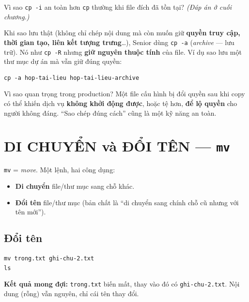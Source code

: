 \documentclass[12pt,a4paper]{article}
\newcommand{\cmd}[1]{\texttt{#1}}
\begin{document}
\begin{checkbox}[title={Tự kiểm tra 3}]
Vì sao \cmd{cp -i} an toàn hơn \cmd{cp} thường khi file đích đã tồn tại? \textit{(Đáp án ở cuối chương.)}
\end{checkbox}

\begin{seniorbox}[title={Góc Senior \#2 --- \texttt{cp -a} khi backup, và ``copy giữ nguyên hồn vía''}]
Khi sao lưu thật (không chỉ chép nội dung mà còn muốn giữ \textbf{quyền truy cập, thời gian tạo, liên kết tượng trưng}\ldots), Senior dùng \cmd{cp -a} (\textit{archive} --- lưu trữ). Nó như \cmd{cp -R} nhưng \textbf{giữ nguyên thuộc tính} của file. Ví dụ sao lưu một thư mục dự án mà vẫn giữ đúng quyền:

\begin{Verbatim}
cp -a hop-tai-lieu hop-tai-lieu-archive
\end{Verbatim}

Vì sao quan trọng trong production? Một file cấu hình bị đổi quyền sau khi copy có thể khiến dịch vụ \textbf{không khởi động được}, hoặc tệ hơn, \textbf{để lộ quyền} cho người không đáng. ``Sao chép đúng cách'' cũng là một kỹ năng an toàn.
\end{seniorbox}

\section{DI CHUYỂN và ĐỔI TÊN --- \texttt{mv}}

\cmd{mv} = \textit{move}. Một lệnh, hai công dụng:
\begin{itemize}[leftmargin=1.4em]
\item \textbf{Di chuyển} file/thư mục sang chỗ khác.
\item \textbf{Đổi tên} file/thư mục (bản chất là ``di chuyển sang chính chỗ cũ nhưng với tên mới'').
\end{itemize}

\subsection{Đổi tên}

\begin{Verbatim}
mv trong.txt ghi-chu-2.txt
ls
\end{Verbatim}

\textbf{Kết quả mong đợi:} \cmd{trong.txt} biến mất, thay vào đó có \cmd{ghi-chu-2.txt}. Nội dung (rỗng) vẫn nguyên, chỉ cái tên thay đổi.
\end{document}
